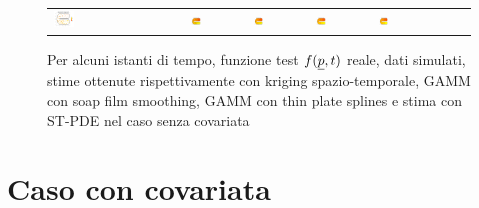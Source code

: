 \documentclass[a4paper,11pt,twoside,openright]{book}							%
\begin{document}
\begin{landscape}
\begin{figure}
\begin{tabular}{lcccccccc}
\includegraphics[trim=0.8cm 0.8cm 2.5cm 1.2cm,clip=true,width=0.19\textwidth,valign=t]{Immagini/simulazioni/Dati_tempo4.png}&
\includegraphics[trim=0cm 0cm 0cm 1.8cm,clip=true,width=0.19\textwidth,valign=t]{Immagini/simulazioni/KRIGtempo4.png}&
\includegraphics[trim=0cm 0cm 0cm 1.8cm,clip=true,width=0.19\textwidth,valign=t]{Immagini/simulazioni/TPStempo4.png}&
\includegraphics[trim=0cm 0cm 0cm 1.8cm,clip=true,width=0.19\textwidth,valign=t]{Immagini/simulazioni/SOAPtempo4.png}&
\includegraphics[trim=0cm 0cm 0cm 1.8cm,clip=true,width=0.19\textwidth,valign=t]{Immagini/simulazioni/STSRtempo4.png}&

\end{tabular}
\caption{Per alcuni istanti di tempo, funzione test $f(\protect\underline{p},t)$ reale, dati simulati, stime ottenute rispettivamente con kriging spazio-temporale, GAMM con soap film smoothing, GAMM con thin plate splines e stima con ST-PDE nel caso senza covariata}
\label{fig:confronto_altri_metodi_nocov}
\end{figure}
\end{landscape}

\section{Caso con covariata}
\end{document}
